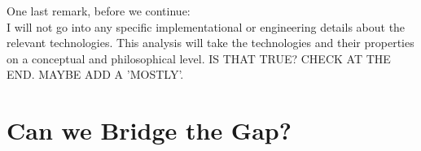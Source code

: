 \documentclass{article}
\newcounter{example}
\begin{document}
One last remark, before we continue:\\

I will not go into any specific implementational or engineering details about
the relevant technologies. This analysis will take the technologies and their
properties on a conceptual and philosophical level. IS THAT TRUE? CHECK AT THE
END. MAYBE ADD A 'MOSTLY'.
%
%
%
%
%
%
%


\section{Can we Bridge the Gap?}
\end{document}
